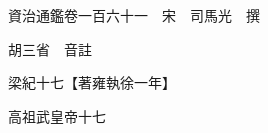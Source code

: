 










 


 
 


 

  
  
  
  
  





  
  
  
  
  
 
  

  

  
  
  



  

 
 

  
   




  

  
  


  　　資治通鑑卷一百六十一　宋　司馬光　撰

　　胡三省　音註

　　梁紀十七【著雍執徐一年】

　　高祖武皇帝十七

